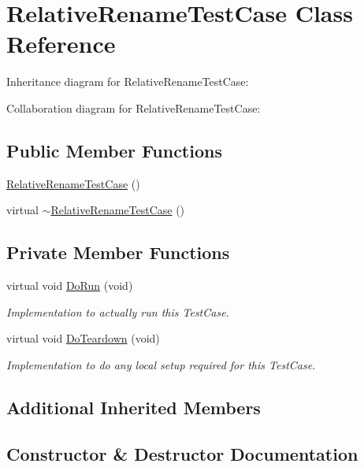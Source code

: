 \hypertarget{classRelativeRenameTestCase}{}\section{Relative\+Rename\+Test\+Case Class Reference}
\label{classRelativeRenameTestCase}


Inheritance diagram for Relative\+Rename\+Test\+Case\+:


Collaboration diagram for Relative\+Rename\+Test\+Case\+:
\subsection*{Public Member Functions}
\begin{DoxyCompactItemize}
\item 
\hyperlink{classRelativeRenameTestCase_a634b05096bffe8e60fe95a83e569e86c}{Relative\+Rename\+Test\+Case} ()
\item 
virtual \hyperlink{classRelativeRenameTestCase_a08a0b06b0cf42f305008f48131054ce2}{$\sim$\+Relative\+Rename\+Test\+Case} ()
\end{DoxyCompactItemize}
\subsection*{Private Member Functions}
\begin{DoxyCompactItemize}
\item 
virtual void \hyperlink{classRelativeRenameTestCase_a452d12c385350229f712e8bc3cff6681}{Do\+Run} (void)
\begin{DoxyCompactList}\small\item\em Implementation to actually run this Test\+Case. \end{DoxyCompactList}\item 
virtual void \hyperlink{classRelativeRenameTestCase_a8acc70a41a62bf999eea905b9ce5de1d}{Do\+Teardown} (void)
\begin{DoxyCompactList}\small\item\em Implementation to do any local setup required for this Test\+Case. \end{DoxyCompactList}\end{DoxyCompactItemize}
\subsection*{Additional Inherited Members}


\subsection{Constructor \& Destructor Documentation}

